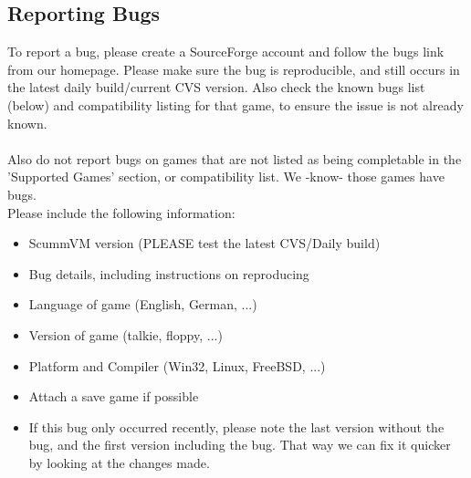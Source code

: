 \subsection{Reporting Bugs}

To report a bug, please create a SourceForge account and follow the bugs
link from our homepage. Please make sure the bug is reproducible, and
still occurs in the latest daily build/current CVS version. Also check
the known bugs list (below) and compatibility listing for that game, to
ensure the issue is not already known.\\
\quad \\
Also do not report bugs on games that are not listed as being completable
in the 'Supported Games' section, or compatibility list. We -know- those
games have bugs.\\
%
Please include the following information:
\begin{itemize}
\item ScummVM version (PLEASE test the latest CVS/Daily build)
\item Bug details, including instructions on reproducing
\item Language of game (English, German, ...)
\item Version of game (talkie, floppy, ...)
\item Platform and Compiler (Win32, Linux, FreeBSD, ...)
\item Attach a save game if possible
\item If this bug only occurred recently, please note the last
          version without the bug, and the first version including
          the bug. That way we can fix it quicker by looking at the
          changes made.
\end{itemize}
